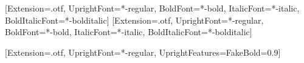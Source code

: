 \usepackage{fontspec}
\setmainfont{texgyretermes}[Extension=.otf, UprightFont=*-regular,
  BoldFont=*-bold, ItalicFont=*-italic, BoldItalicFont=*-bolditalic]
\setmonofont{texgyrecursor}[Extension=.otf, UprightFont=*-regular,
  BoldFont=*-bold, ItalicFont=*-italic, BoldItalicFont=*-bolditalic]
\usepackage{unicode-math}
\usepackage{xcolor}
\usepackage{tikz}
\usetikzlibrary{arrows.meta, positioning, fit, calc, backgrounds,
  shapes.geometric, shapes.misc}


\newcommand\pplab{\fontsize{8}{9.5}\selectfont}
\newcommand\ppnote{\fontsize{7}{8.4}\selectfont}
\newcommand\ppsmall{\fontsize{6.5}{7.8}\selectfont}
\newfontfamily{}[Extension=.otf, UprightFont=*-regular,
  UprightFeatures={FakeBold=0.9}]
\newcommand\ppcode[1]{{\pptt #1}}
\newcommand\ppsec[1]{{\color{ppsec}#1}}

\newlength\ppsingle \setlength\ppsingle{252pt}
\newlength\ppdouble \setlength\ppdouble{516pt}

